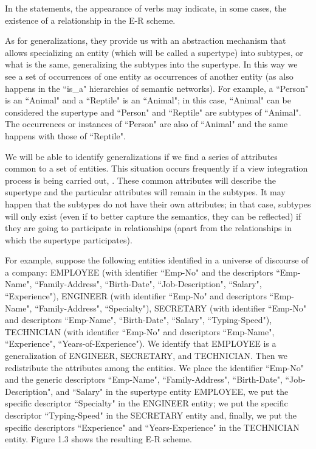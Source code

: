 \documentclass{article}
\numberwithin{figure}{section}
\begin{document}
In the statements, the appearance of verbs may indicate, in some cases, the existence of a relationship in the E-R scheme.

As for generalizations, they provide us with an abstraction mechanism that allows specializing an entity (which will be called a supertype) into subtypes, or what is the same, generalizing the subtypes into the supertype.  In this way we see a set of occurrences of one entity as occurrences of another entity (as also happens in the ``is\_a" hierarchies of semantic networks).  For example, a ``Person" is an ``Animal" and a ``Reptile" is an ``Animal"; in this case, ``Animal" can be considered the supertype and ``Person" and ``Reptile" are subtypes of ``Animal".  The occurrences or instances of ``Person" are also of ``Animal" and the same happens with those of ``Reptile".

We will be able to identify generalizations if we find a series of attributes common to a set of entities.  This situation occurs frequently if a view integration process is being carried out, \cite{demiguel1999fundamentos}.  These common attributes will describe the supertype and the particular attributes will remain in the subtypes.  It may happen that the subtypes do not have their own attributes; in that case, subtypes will only exist (even if to better capture the semantics, they can be reflected) if they are going to participate in relationships (apart from the relationships in which the supertype participates).

For example, suppose the following entities identified in a universe of discourse of a company: EMPLOYEE (with identifier ``Emp-No" and the descriptors ``Emp-Name", ``Family-Address", ``Birth-Date", ``Job-Description", ``Salary", ``Experience"), ENGINEER (with identifier ``Emp-No" and descriptors ``Emp-Name", ``Family-Address", ``Specialty"), SECRETARY (with identifier ``Emp-No" and descriptors ``Emp-Name", ``Birth-Date", ``Salary", ``Typing-Speed"), TECHNICIAN (with identifier ``Emp-No" and descriptors ``Emp-Name", ``Experience", ``Years-of-Experience").  We identify that EMPLOYEE is a generalization of ENGINEER, SECRETARY, and TECHNICIAN.  Then we redistribute the attributes among the entities.  We place the identifier ``Emp-No" and the generic descriptors ``Emp-Name", ``Family-Address", ``Birth-Date", ``Job-Description", and ``Salary" in the supertype entity EMPLOYEE, we put the specific descriptor ``Specialty" in the ENGINEER entity; we put the specific descriptor ``Typing-Speed" in the SECRETARY entity and, finally, we put the specific descriptors ``Experience" and ``Years-Experience" in the TECHNICIAN entity.  Figure 1.3 shows the resulting E-R scheme.
\end{document}
